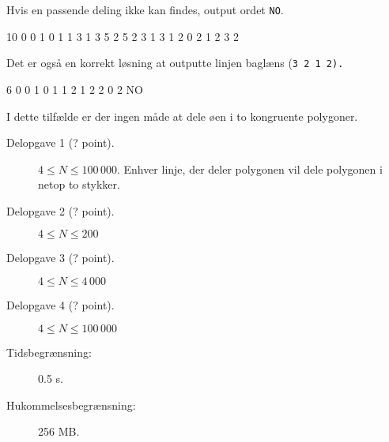 \documentclass{boi2014-dk}
\newcommand{\constant}[1]{{\tt #1}}
\begin{document}
    Hvis en passende deling ikke kan findes, output ordet \constant{NO}.

    \Examples
	\example
	{
		10
		0 0
		1 0
		1 1
		3 1
		3 5
		2 5
		2 3
		1 3
		1 2
		0 2
	}
	{
		1 2 3 2
	}
	{
        Det er også en korrekt løsning at outputte linjen baglæns (\tt{3 2 1
        2}).

        \begin{center}
        \end{center}
	}

	\example
	{
		6
		0 0
		1 0
		1 1
		2 1
		2 2
		0 2
	}
	{
		NO
	}
    {
        I dette tilfælde er der ingen måde at dele øen i to kongruente
        polygoner.
        \begin{center}
        \end{center}
    }

    \Scoring

    \begin{description}
        \item[Delopgave 1 (? point).] $4 \le N \le 100\,000$. Enhver linje,
            der deler polygonen vil dele polygonen i netop to stykker.
        \item[Delopgave 2 (? point).] $4 \le N \le 200$
        \item[Delopgave 3 (? point).] $4 \le N \le 4\,000$
        \item[Delopgave 4 (? point).] $4 \le N \le 100\,000$
    \end{description}

    \Constraints

    \begin{description}
        \item[Tidsbegrænsning:] 0.5 s.
        \item[Hukommelsesbegrænsning:] 256 MB.
    \end{description}
\end{document}

